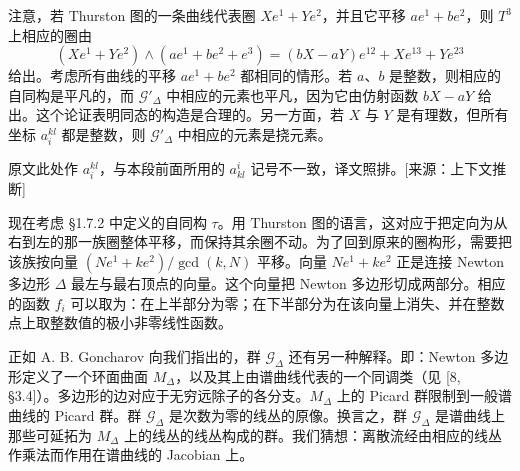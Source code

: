 注意，若 Thurston 图的一条曲线代表圈 $Xe^1+Ye^2$，并且它平移 $ae^1+be^2$，则 $T^3$ 上相应的圈由
\[
(Xe^1+Ye^2)\wedge(ae^1+be^2+e^3)=(bX-aY)e^{12}+Xe^{13}+Ye^{23}
\]
给出。考虑所有曲线的平移 $ae^1+be^2$ 都相同的情形。若 $a$、$b$ 是整数，则相应的自同构是平凡的，而 $\mathcal{G}'_\Delta$ 中相应的元素也平凡，因为它由仿射函数 $bX-aY$ 给出。这个论证表明同态的构造是合理的。另一方面，若 $X$ 与 $Y$ 是有理数，但所有坐标 $a^{kl}_i$ 都是整数，则 $\mathcal{G}'_\Delta$ 中相应的元素是挠元素。\begin{annote}原文此处作 $a^{kl}_i$，与本段前面所用的 $a^i_{kl}$ 记号不一致，译文照排。[来源：上下文推断]\end{annote}

现在考虑 §1.7.2 中定义的自同构 $\tau$。用 Thurston 图的语言，这对应于把定向为从右到左的那一族圈整体平移，而保持其余圈不动。为了回到原来的圈构形，需要把该族按向量 $(Ne^1+ke^2)/\gcd(k,N)$ 平移。向量 $Ne^1+ke^2$ 正是连接 Newton 多边形 $\Delta$ 最左与最右顶点的向量。这个向量把 Newton 多边形切成两部分。相应的函数 $f_i$ 可以取为：在上半部分为零；在下半部分为在该向量上消失、并在整数点上取整数值的极小非零线性函数。

正如 A. B. Goncharov 向我们指出的，群 $\mathcal{G}_\Delta$ 还有另一种解释。即：Newton 多边形定义了一个环面曲面 $M_\Delta$，以及其上由谱曲线代表的一个同调类（见 [8, §3.4]）。多边形的边对应于无穷远除子的各分支。$M_\Delta$ 上的 Picard 群限制到一般谱曲线的 Picard 群。群 $\mathcal{G}_\Delta$ 是次数为零的线丛的原像。换言之，群 $\mathcal{G}_\Delta$ 是谱曲线上那些可延拓为 $M_\Delta$ 上的线丛的线丛构成的群。我们猜想：离散流经由相应的线丛作乘法而作用在谱曲线的 Jacobian 上。
